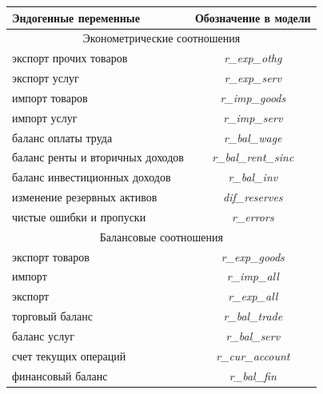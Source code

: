 \documentclass[a4paper, 14pt]{extarticle}
\begin{document}
\begin{center}
	\small
	\begin{tabular}{ l | c }
		\toprule
		Эндогенные переменные  & Обозначение в модели  \\
		\midrule
		\multicolumn{2}{c}{Эконометрические соотношения}\\
		\midrule 
		экспорт прочих товаров & \textit{ r\_exp\_othg } \\
		экспорт услуг & \textit{ r\_exp\_serv } \\
		импорт товаров &  \textit{ r\_imp\_goods } \\  
		импорт услуг &  \textit{ r\_imp\_serv } \\  
		баланс оплаты труда &  \textit{ r\_bal\_wage } \\  
		баланс ренты и вторичных доходов &  \textit{ r\_bal\_rent\_sinc } \\ 
		баланс инвестиционных доходов &  \textit{ r\_bal\_inv } \\
		изменение резервных активов &  \textit{ dif\_reserves } \\
		чистые ошибки и пропуски &  \textit{ r\_errors } \\
		\midrule
		\multicolumn{2}{c}{Балансовые соотношения}\\
		\midrule
		экспорт товаров & \textit{ r\_exp\_goods } \\
		импорт  &  \textit{ r\_imp\_all } \\  
		экспорт  &  \textit{ r\_exp\_all } \\  
		торговый баланс  &  \textit{ r\_bal\_trade } \\
		баланс услуг  &  \textit{ r\_bal\_serv } \\
		счет текущих операций  &  \textit{ r\_cur\_account } \\
		финансовый баланс  &  \textit{ r\_bal\_fin } \\
		\bottomrule
	\end{tabular}
\normalsize
{}\label{tab:1}
\end{center}
\end{document}
